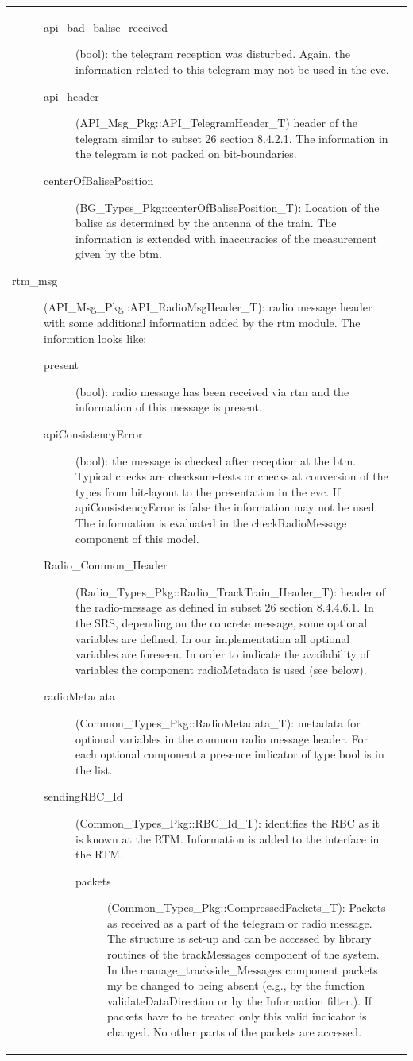 \begin{longtable}{p{}p{}}
\begin{description}
\begin{description}
\item[api\_bad\_balise\_received](bool): the telegram reception was disturbed. Again, the information related to this telegram may not be used in the evc.
\item[api\_header](API\_Msg\_Pkg::API\_TelegramHeader\_T) header of the telegram similar to subset 26 section 8.4.2.1. The information in the telegram is not packed on bit-boundaries.
\item[centerOfBalisePosition](BG\_Types\_Pkg::centerOfBalisePosition\_T): Location of the balise as determined by the antenna of the train. The information is extended with inaccuracies of the measurement given by the btm.
\end{description}

\item[rtm\_msg](API\_Msg\_Pkg::API\_RadioMsgHeader\_T): radio message header with some additional information added by the rtm module. The informtion looks like:
\begin{description}
\item[present](bool): radio message has been received via rtm and the information of this message is present. 
\item[apiConsistencyError](bool): the message is checked after reception at the btm. Typical checks are checksum-tests or checks at conversion of the types from bit-layout to the presentation in the evc. If apiConsistencyError is false the information may not be used. The information is evaluated in the checkRadioMessage component of this model.
\item[Radio\_Common\_Header](Radio\_Types\_Pkg::Radio\_TrackTrain\_Header\_T): header of the radio-message as defined in subset 26 section 8.4.4.6.1. In the SRS, depending on the concrete message, some optional variables are defined. In our implementation all optional variables are foreseen. In order to indicate the availability of variables the component radioMetadata is used (see below).
\item[radioMetadata](Common\_Types\_Pkg::RadioMetadata\_T): metadata for optional variables in the common radio message header. For each optional component a presence indicator of type bool is in the list.  
\item[sendingRBC\_Id](Common\_Types\_Pkg::RBC\_Id\_T): identifies the RBC as it is known at the RTM. Information is added to the interface in the RTM.
\begin{description}
\item[packets](Common\_Types\_Pkg::CompressedPackets\_T): Packets as received as a part of the telegram or radio message. The structure is set-up and can be accessed by library routines of the trackMessages component of the system. In the manage\_trackside\_Messages component packets my be changed to being absent (e.g., by the function validateDataDirection or by the Information filter.). If packets have to be treated only this valid indicator is changed. No other parts of the packets are accessed.


\end{description}
\end{description}
\end{description}
\end{longtable}
